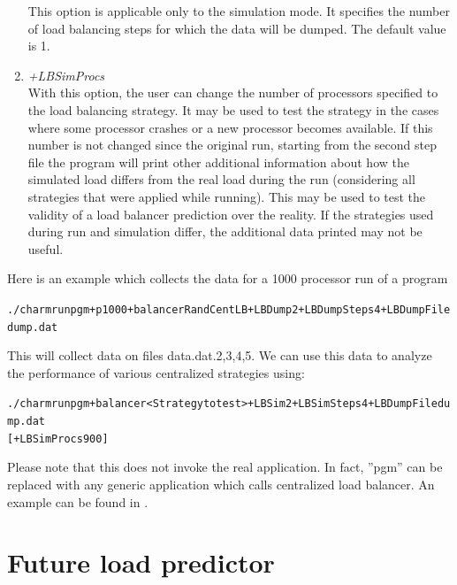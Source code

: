 \begin{enumerate}
        This option is applicable only to the simulation mode. It specifies the number of
  load balancing steps for which the data will be dumped. The default value is 1.
\item {\em +LBSimProcs}\\
        With this option, the user can change the number of processors
  specified to the load balancing strategy. It may be used to test
	the strategy in the cases where some processor crashes or a new processor becomes available. If this number is not
	changed since the original run, starting from the second step file the program will print other additional
	information about how the simulated load differs from the real load during the run (considering all
	strategies that were applied while running). This may be used to test the validity of a load balancer
	prediction over the reality. If the strategies used during run and simulation differ, the additional data
	printed may not be useful.
\end{enumerate}
Here is an example which collects the data for a 1000 processor run of a program
\begin{alltt}
./charmrun pgm +p1000 +balancer RandCentLB +LBDump 2 +LBDumpSteps 4 +LBDumpFile dump.dat
\end{alltt}
This will collect data on files data.dat.{2,3,4,5}. We can use this data to
analyze the performance of various centralized strategies using:
\begin{alltt}
./charmrun pgm +balancer <Strategy to test> +LBSim 2 +LBSimSteps 4 +LBDumpFile dump.dat
[+LBSimProcs 900]
\end{alltt}
Please note that this does not invoke the real application. In fact,
 ''pgm'' can be replaced with any generic application which calls centralized load balancer.
An example can be found in .

\section{Future load predictor}

